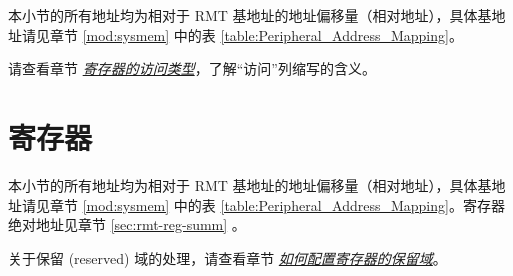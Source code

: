 \documentclass[main\_\_CN.tex]{subfiles}
\begin{document}
本小节的所有地址均为相对于 RMT 基地址的地址偏移量（相对地址），具体基地址请见章节 \ref{mod:sysmem} \textit{} 中的表 \ref{table:Peripheral_Address_Mapping}。

请查看章节 \hyperref[glossary-access-types]{\textit{寄存器的访问类型}}，了解“访问”列缩写的含义。



\section{寄存器}

本小节的所有地址均为相对于 RMT 基地址的地址偏移量（相对地址），具体基地址请见章节 \ref{mod:sysmem} \textit{} 中的表 \ref{table:Peripheral_Address_Mapping}。寄存器绝对地址见章节 \ref{sec:rmt-reg-summ} \textit{}。

关于保留 (reserved) 域的处理，请查看章节 \hyperref[programming-reserved-field]{\textit{如何配置寄存器的保留域}}。


\end{document}
